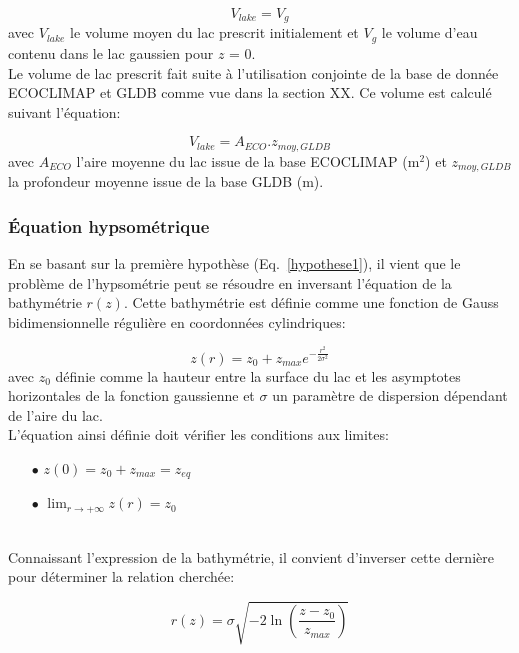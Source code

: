 \begin{equation}
\label{hypothese2}
V_{lake} = V_{g}
\end{equation}
avec $V_{lake}$ le volume moyen du lac prescrit initialement et $V_{g}$ le volume d'eau contenu dans le lac gaussien pour $z$ = 0.\\
\clearpage
\noindent Le volume de lac prescrit fait suite à l'utilisation conjointe de la base de donnée ECOCLIMAP et GLDB comme vue dans la section XX. Ce volume est calculé suivant l'équation:

\begin{equation}
V_{lake} = A_{ECO}.z_{moy,GLDB}
\end{equation}
avec $A_{ECO}$ l'aire moyenne du lac issue de la base ECOCLIMAP (m$^{2}$) et $z_{moy,GLDB}$ la profondeur moyenne issue de la base GLDB (m).


\subsubsection*{\'Equation hypsométrique}

\noindent En se basant sur la première hypothèse (Eq.~\ref{hypothese1}), il vient que le problème de l'hypsométrie peut se résoudre en inversant l'équation de la bathymétrie $r(z)$. Cette bathymétrie est définie comme une fonction de Gauss bidimensionnelle régulière en coordonnées cylindriques:

\begin{equation}
\label{eq:bathy_gaussian}
z(r) = z_0 + z_{max} e^{-\frac{r^2}{2\sigma^2}}
\end{equation}
avec $z_0$ définie comme la hauteur entre la surface du lac et les asymptotes horizontales de la fonction gaussienne et $\sigma$ un paramètre de dispersion dépendant de l'aire du lac.\\

\noindent L'équation ainsi définie doit vérifier les conditions aux limites:

\begin{itemize}
	\item[$\bullet$]  $z(0)= z_0 + z_{max} = z_{eq}$
	\item[$\bullet$]  $\lim_{r\to+\infty} z(r) = z_0$
\end{itemize}

~\\
Connaissant l'expression de la bathymétrie, il convient d'inverser cette dernière pour déterminer la relation cherchée:

\begin{equation}
\label{eq:invbathy_gaussian}
r(z) = \sigma\sqrt{-2\ln\left(\frac{z-z_0}{z_{max}}\right)}
\end{equation}

